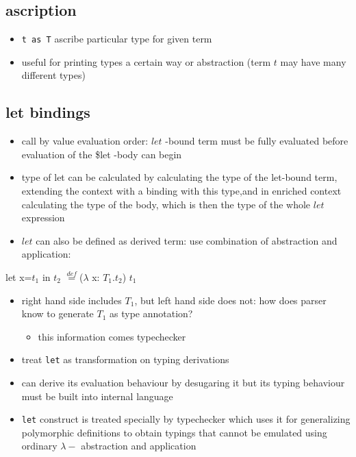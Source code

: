 \documentclass[11pt]{article}
\begin{document}
\subsection{ascription}
\label{sec:orge39d8bc}
\begin{itemize}
\item \texttt{t as T} ascribe particular type for given term
\item useful for printing types a certain way or abstraction (term \(t\) may have many different types)
\end{itemize}

\subsection{let bindings}
\label{sec:org0c812c4}
\begin{itemize}
\item call by value evaluation order: \(let\) -bound term must be fully evaluated before evaluation of the \$let -body can begin
\item type of let can be calculated by calculating the type of the let-bound term, extending the context with a binding with this type,and in enriched context calculating the type of the body, which is then the type of the whole \(let\) expression
\item \(let\) can also be defined as derived term: use combination of abstraction and application:
\end{itemize}

let x=\(t_1\) in \(t_2\) \(\stackrel{def}{=}\)(\(\lambda\) x: \(T_1\).\(t_2\)) \(t_1\)

\begin{itemize}
\item right hand side includes \(T_1\), but left hand side does not: how does parser know to generate \(T_1\) as type annotation?
\begin{itemize}
\item this information comes typechecker
\end{itemize}
\item treat \texttt{let} as transformation on typing derivations
\item can derive its evaluation behaviour by desugaring it but its typing behaviour must be built into internal language
\item \texttt{let} construct is treated specially by typechecker which uses it for generalizing polymorphic definitions to obtain typings that cannot be emulated using ordinary \(\lambda-\) abstraction and application
\end{itemize}
\end{document}
